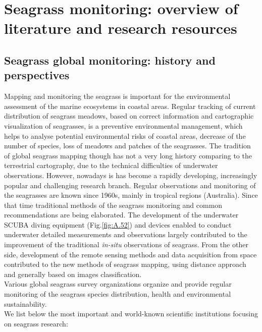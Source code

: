 \documentclass[11pt]{article}
\begin{document}
\pagebreak

\section[Overview of literature]{Seagrass monitoring: overview of literature and research resources} \label{sec:2}
\renewcommand{\headrulewidth}{0.4pt}

\subsection{Seagrass global monitoring: history and perspectives}
Mapping and monitoring the seagrass is important for the environmental assessment of the marine
ecosystems in coastal areas. Regular tracking of current distribution of seagrass meadows, based on
correct information and cartographic visualization of seagrasses, is a preventive environmental
management, which helps to analyse potential environmental risks of coastal areas, decrease of the
number of species, loss of meadows and patches of the seagrasses.
The tradition of global seagrass mapping though has not a very long history comparing to the
terrestrial cartography, due to the technical difficulties of underwater observations. However, nowadays is
has become a rapidly developing, increasingly popular and challenging research branch.\vspace{1ex}
Regular observations and monitoring of the seagrasses are known since 1960s, mainly in tropical
regions (Australia). Since that time traditional methods of the seagrass monitoring and common
recommendations are being elaborated. The development of the underwater \ac{SCUBA} diving
equipment (Fig.\ref{fig:A.52}) and devices enabled to conduct underwater detailed measurements and observations
largely contributed to the improvement of the traditional \textit{in-situ} observations of seagrass. From the
other side, development of the remote sensing methods and data acquisition from space contributed to
the new methods of seagrass mapping, using distance approach and generally based on images classification.\vspace{1ex}\\
Various global seagrass survey organizations  organize and provide regular monitoring of the seagrass species distribution, health and environmental sustainability. \\ We list below the most important and world-known scientific institutions focusing on seagrass research: 
\end{document}
